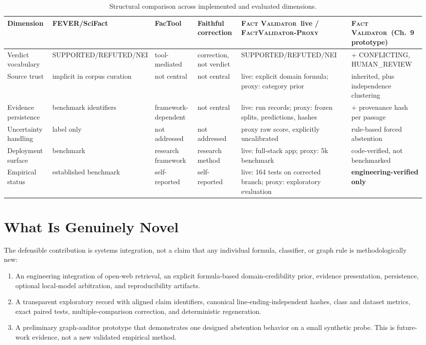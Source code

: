 \documentclass[12pt,a4paper,openany]{report}
\newcommand{\system}{\textsc{Fact Validator}}
\newcommand{\proxy}{\textsc{FactValidator-Proxy}}
\begin{document}
\begin{table}[H]
\centering
\caption{Structural comparison across implemented and evaluated dimensions.}
\label{tab:novelty-full}
\scriptsize
{}
\begin{tabularx}{\textwidth}{p{2.2cm}YYYYY}
\toprule
Dimension & FEVER/SciFact & FacTool & Faithful correction & \system\ live / \proxy & \system\ (Ch.~9 prototype) \\
\midrule
Verdict vocabulary & SUPPORTED/\allowbreak REFUTED/\allowbreak NEI & tool-mediated & correction, not verdict & SUPPORTED/\allowbreak REFUTED/\allowbreak NEI & + CONFLICTING, HUMAN\_REVIEW \\
Source trust & implicit in corpus curation & not central & not central & live: explicit domain formula; proxy: category prior & inherited, plus independence clustering \\
Evidence persistence & benchmark identifiers & framework-dependent & not central & live: run records; proxy: frozen splits, predictions, hashes & + provenance hash per passage \\
Uncertainty handling & label only & not addressed & not addressed & proxy raw score, explicitly uncalibrated & rule-based forced abstention \\
Deployment surface & benchmark & research framework & research method & live: full-stack app; proxy: 5k benchmark & code-verified, not benchmarked \\
Empirical status & established benchmark & self-reported & self-reported & live: 164 tests on corrected branch; proxy: exploratory evaluation & \textbf{engineering-verified only} \\
\bottomrule
\end{tabularx}
\end{table}

\section{What Is Genuinely Novel}
The defensible contribution is systems integration, not a claim that any
individual formula, classifier, or graph rule is methodologically new:
\begin{enumerate}
  \item An engineering integration of open-web retrieval, an explicit formula-based domain-credibility prior, evidence presentation, persistence, optional local-model arbitration, and reproducibility artifacts.
  \item A transparent exploratory record with aligned claim identifiers, canonical line-ending-independent hashes, class and dataset metrics, exact paired tests, multiple-comparison correction, and deterministic regeneration.
  \item A preliminary graph-auditor prototype that demonstrates one designed abstention behavior on a small synthetic probe. This is future-work evidence, not a new validated empirical method.
\end{enumerate}
\end{document}
